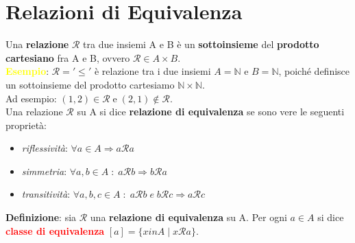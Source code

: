 \section{Relazioni di Equivalenza}
Una \textbf{relazione} $\mathcal{R}$ tra due insiemi A e B è un \textbf{sottoinsieme} del \textbf{prodotto cartesiano} fra A e B, ovvero $\mathcal{R} \in A \times B$. \\
\textcolor{yellow}{\textbf{Esempio}}: $\mathcal{R} = '\leq'$ è relazione tra i due insiemi $A = \mathbb{N}$ e $B = \mathbb{N}$, poiché definisce un sottoinsieme del prodotto cartesiamo $\mathbb{N} \times \mathbb{N}$. \\
Ad esempio: $(1, 2) \in \mathcal{R} \; \text{e} \; (2, 1) \notin \mathcal{R}$. \\ \newline
Una relazione $\mathcal{R}$ su A si dice \textbf{relazione di equivalenza} se sono vere le seguenti proprietà:
\begin{itemize}
    \item \textit{riflessività}: $\forall a \in A \Rightarrow a\mathcal{R}a$
    \item \textit{simmetria}: $\forall a,b \in A \; : \; a\mathcal{R}b \Rightarrow b\mathcal{R}a$
    \item \textit{transitività}: $\forall a,b,c \in A \; : \; a\mathcal{R}b \; e \; b\mathcal{R}c \Rightarrow a\mathcal{R}c$
\end{itemize}
\textbf{Definizione}: sia $\mathcal{R}$ una \textbf{relazione di equivalenza} su A. Per ogni $a \in A$ si dice \textcolor{red}{\textbf{classe di equivalenza}} $[a] = \{x in A \; | \; x\mathcal{R}a\}$.
